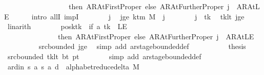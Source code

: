 \begin{isabellebody}
\ \ \ \ \ \ \ \ \ \ \ \ \ \ \ \ \ \ then\ AR{\isacharunderscore}{\kern0pt}AtFirstProper\ else\ AR{\isacharunderscore}{\kern0pt}AtFurtherProper{\isacharparenright}{\kern0pt}{\isacharparenright}{\kern0pt}\ j\ {\isacharequal}{\kern0pt}\ AR{\isacharunderscore}{\kern0pt}AtLE{\isachardoublequoteclose}\isanewline
\ \ \ \ \isamarkupfalse%
\ {\isacharparenleft}{\kern0pt}intro\ allI\ impI{\isacharparenright}{\kern0pt}\isanewline
\ \ \ \ \ \ \isamarkupfalse%
\ j\ \isamarkupfalse%
\ jge{\isacharcolon}{\kern0pt}\ {\isachardoublequoteopen}k{\isacharunderscore}{\kern0pt}tm\ M\ {\isasymle}\ j{\isachardoublequoteclose}\isanewline
\ \ \ \ \ \ \isamarkupfalse%
\ {\isachardoublequoteopen}j\ {\isasymnoteq}\ tk{\isachardoublequoteclose}\ \isamarkupfalse%
\ tk{\isacharunderscore}{\kern0pt}lt\ jge\ \isamarkupfalse%
\ linarith\isanewline
\ \ \ \ \ \ \isamarkupfalse%
\ {\isachardoublequoteopen}{\isacharparenleft}{\kern0pt}posk{\isacharparenleft}{\kern0pt}tk\ {\isacharcolon}{\kern0pt}{\isacharequal}{\kern0pt}\ if\ {\isacharquery}{\kern0pt}a\ tk\ {\isacharequal}{\kern0pt}\ LE{}\isanewline
\ \ \ \ \ \ \ \ \ \ \ \ \ \ \ then\ AR{\isacharunderscore}{\kern0pt}AtFirstProper\ else\ AR{\isacharunderscore}{\kern0pt}AtFurtherProper{\isacharparenright}{\kern0pt}{\isacharparenright}{\kern0pt}\ j\ {\isacharequal}{\kern0pt}\ AR{\isacharunderscore}{\kern0pt}AtLE{\isachardoublequoteclose}\isanewline
\ \ \ \ \ \ \ \ \isamarkupfalse%
\ src{\isacharunderscore}{\kern0pt}bounded\ jge\ \isamarkupfalse%
\ {\isacharparenleft}{\kern0pt}simp\ add{\isacharcolon}{\kern0pt}\ ar{\isacharunderscore}{\kern0pt}stage{\isacharunderscore}{\kern0pt}bounded{\isacharunderscore}{\kern0pt}def{\isacharparenright}{\kern0pt}\isanewline
\ \ \ \ \isamarkupfalse%
\isanewline
\ \ \ \ \isamarkupfalse%
\ {\isacharquery}{\kern0pt}thesis\ \isamarkupfalse%
\ src{\isacharunderscore}{\kern0pt}bounded\ tk{\isacharunderscore}{\kern0pt}lt\ bt\ pt\isanewline
\ \ \ \ \ \ \isamarkupfalse%
\ {\isacharparenleft}{\kern0pt}simp\ add{\isacharcolon}{\kern0pt}\ ar{\isacharunderscore}{\kern0pt}stage{\isacharunderscore}{\kern0pt}bounded{\isacharunderscore}{\kern0pt}def{\isacharparenright}{\kern0pt}\isanewline
\ \ \isamarkupfalse%
\isanewline
\ \ \isamarkupfalse%
\ ard{\isacharunderscore}{\kern0pt}in{\isacharcolon}{\kern0pt}\ {\isachardoublequoteopen}{\isacharparenleft}{\kern0pt}{\isacharquery}{\kern0pt}s{\isacharcomma}{\kern0pt}\ {\isacharquery}{\kern0pt}a{\isacharcomma}{\kern0pt}\ {\isacharquery}{\kern0pt}s{\isacharprime}{\kern0pt}{\isacharcomma}{\kern0pt}\ {\isacharquery}{\kern0pt}a{\isacharcomma}{\kern0pt}\ {\isacharquery}{\kern0pt}d{\isacharparenright}{\kern0pt}\ {\isasymin}\ alphabet{\isacharunderscore}{\kern0pt}reduce{\isacharunderscore}{\kern0pt}delta\ M{\isachardoublequoteclose}\isanewline

\end{isabellebody}
